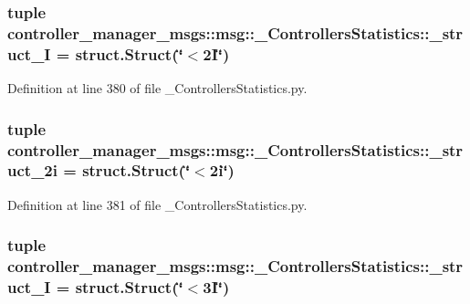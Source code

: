 \subsubsection[{\-\_\-struct\-\_\-2\-I}]{\setlength{\rightskip}{0pt plus 5cm}tuple {\bf controller\-\_\-manager\-\_\-msgs\-::msg\-::\-\_\-\-Controllers\-Statistics\-::\-\_\-struct\-\_\-I} = struct.\-Struct(\char`\"{}$<$2\-I\char`\"{})}\label{namespacecontroller__manager__msgs_1_1msg_1_1__ControllersStatistics_a675d2303a1e52d30c45599ee606a6144}


\-Definition at line 380 of file \-\_\-\-Controllers\-Statistics.\-py.

\subsubsection[{\-\_\-struct\-\_\-2i}]{\setlength{\rightskip}{0pt plus 5cm}tuple {\bf controller\-\_\-manager\-\_\-msgs\-::msg\-::\-\_\-\-Controllers\-Statistics\-::\-\_\-struct\-\_\-2i} = struct.\-Struct(\char`\"{}$<$2i\char`\"{})}\label{namespacecontroller__manager__msgs_1_1msg_1_1__ControllersStatistics_aca0ccdaa28f033b0f1059335458ba2b9}


\-Definition at line 381 of file \-\_\-\-Controllers\-Statistics.\-py.

\subsubsection[{\-\_\-struct\-\_\-3\-I}]{\setlength{\rightskip}{0pt plus 5cm}tuple {\bf controller\-\_\-manager\-\_\-msgs\-::msg\-::\-\_\-\-Controllers\-Statistics\-::\-\_\-struct\-\_\-I} = struct.\-Struct(\char`\"{}$<$3\-I\char`\"{})}\label{namespacecontroller__manager__msgs_1_1msg_1_1__ControllersStatistics_a7f1a3ef2aa6412b4858fd4d97f2155b3}


